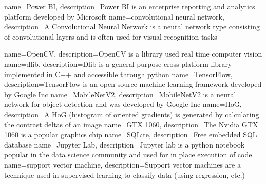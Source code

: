 

{
  name=Power BI,
  description={Power BI is an enterprise reporting and analytics platform developed by Microsoft}
}
{
  name=convolutional neural network,
  description={A Convolutional Neural Network is a neural network type consisting of convolutional layers and is often used for visual recognition tasks}
}


{
  name=OpenCV,
  description={OpenCV is a library used real time computer vision}
}
{
  name=dlib,
  description={Dlib is a general purpose cross platform library implemented in C++ and accessible through python}
}
{
  name=TensorFlow,
  description={TensorFlow is an open source machine learning framework developed by Google Inc}
}
{
  name=MobileNetV2,
  description={MobileNetV2 is a neural network for object detection and was developed by Google Inc}
}
{
  name=HoG,
  description={A HoG (histogram of oriented gradients) is generated by calculating the contrast deltas of an image}
}
{
  name=GTX 1060,
  description={The Nvidia GTX 1060 is a popular graphics chip}
}
{
  name=SQLite,
  description={Free embedded SQL database}
}
{
  name=Jupyter Lab,
  description={Jupyter lab is a python notebook popular in the data science community and used for in place execution of code}
}
{
  name=support vector machine,
  description={Support vector machines are a technique used in supervised learning to classify data (using regression, etc.)}
}